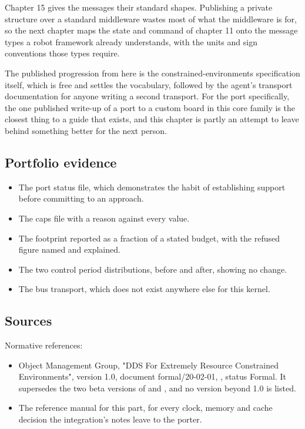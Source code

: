 Chapter 15 gives the messages their standard shapes. Publishing a private
structure over a standard middleware wastes most of what the middleware is for,
so the next chapter maps the state and command of chapter 11 onto the message
types a robot framework already understands, with the units and sign conventions
those types require.

The published progression from here is the constrained-environments
specification itself, which is free and settles the vocabulary, followed by the
agent's transport documentation for anyone writing a second transport. For the
port specifically, the one published write-up of a port to a custom board in this
core family is the closest thing to a guide that exists, and this chapter is
partly an attempt to leave behind something better for the next person.

\subsection*{Portfolio evidence}

\begin{itemize}
\item The port status file, which demonstrates the habit of establishing support
before committing to an approach.
\item The caps file with a reason against every value.
\item The footprint reported as a fraction of a stated budget, with the
refused figure named and explained.
\item The two control period distributions, before and after, showing no change.
\item The bus transport, which does not exist anywhere else for this kernel.
\end{itemize}

\subsection*{Sources}

Normative references:
\begin{itemize}
\item Object Management Group, "DDS For Extremely Resource Constrained
Environments", version 1.0, document formal/20-02-01, , status
Formal. It supersedes the two beta versions of  and , and no
version beyond 1.0 is listed.
\item The reference manual for this part, for every clock, memory and cache
decision the integration's notes leave to the porter.
\end{itemize}

